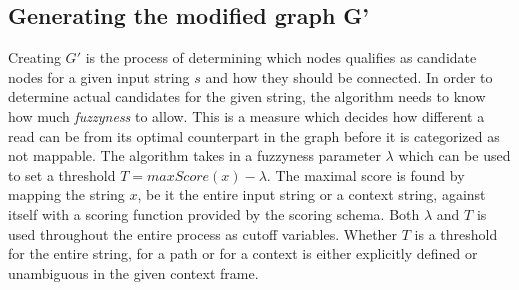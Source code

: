 \documentclass{article}
\begin{document}
\subsection{Generating the modified graph G'}
Creating $G'$ is the process of determining which nodes qualifies as candidate nodes for a given input string $s$ and how they should be connected. In order to determine actual candidates for the given string, the algorithm needs to know how much \textit{fuzzyness} to allow. This is a measure which decides how different a read can be from its optimal counterpart in the graph before it is categorized as not mappable. The algorithm takes in a fuzzyness parameter $\lambda$ which can be used to set a threshold $T=maxScore(x)-\lambda$. The maximal score is found by mapping the string $x$, be it the entire input string or a context string, against itself with a scoring function provided by the scoring schema. Both $\lambda$ and $T$ is used throughout the entire process as cutoff variables. Whether $T$ is a threshold for the entire string, for a path or for a context is either explicitly defined or unambiguous in the given context frame.\\
\end{document}
